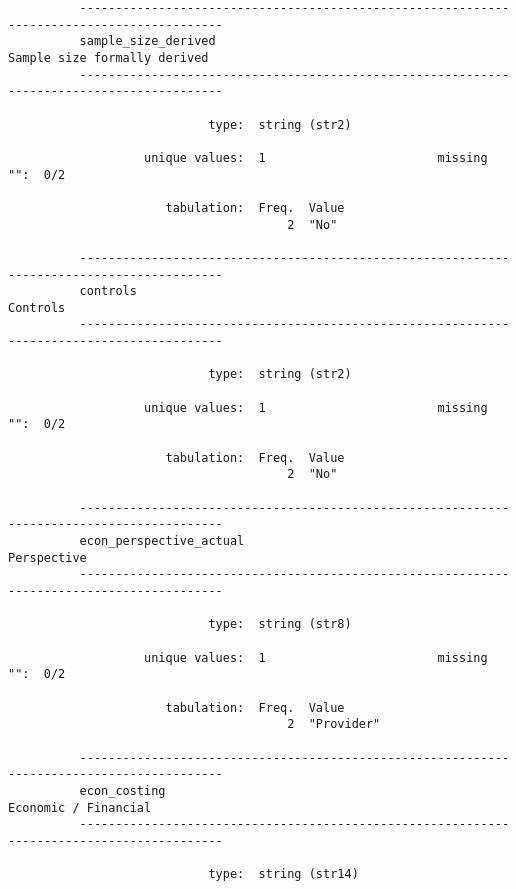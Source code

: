 \documentclass{article}
\begin{document}
\begin{verbatim}
          ------------------------------------------------------------------------------------------
          sample_size_derived                                           Sample size formally derived
          ------------------------------------------------------------------------------------------
          
                            type:  string (str2)
          
                   unique values:  1                        missing "":  0/2
          
                      tabulation:  Freq.  Value
                                       2  "No"
          
          ------------------------------------------------------------------------------------------
          controls                                                                          Controls
          ------------------------------------------------------------------------------------------
          
                            type:  string (str2)
          
                   unique values:  1                        missing "":  0/2
          
                      tabulation:  Freq.  Value
                                       2  "No"
          
          ------------------------------------------------------------------------------------------
          econ_perspective_actual                                                        Perspective
          ------------------------------------------------------------------------------------------
          
                            type:  string (str8)
          
                   unique values:  1                        missing "":  0/2
          
                      tabulation:  Freq.  Value
                                       2  "Provider"
          
          ------------------------------------------------------------------------------------------
          econ_costing                                                          Economic / Financial
          ------------------------------------------------------------------------------------------
          
                            type:  string (str14)
          

\end{verbatim}
\end{document}
